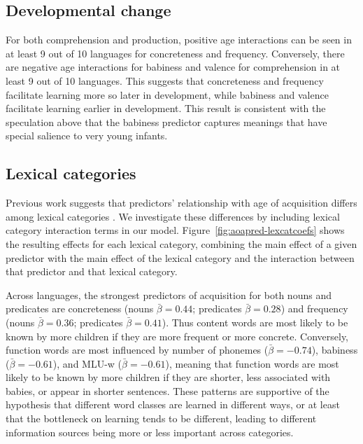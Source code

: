 \documentclass[
   11pt,
       ]{book}
\begin{document}
\hypertarget{developmental-change}{%
\subsection{Developmental change}\label{developmental-change}}

For both comprehension and production, positive age interactions can be seen in at least 9 out of 10 languages for concreteness and frequency. Conversely, there are negative age interactions for babiness and valence for comprehension in at least 9 out of 10 languages. This suggests that concreteness and frequency facilitate learning more so later in development, while babiness and valence facilitate learning earlier in development. This result is consistent with the speculation above that the babiness predictor captures meanings that have special salience to very young infants.

\hypertarget{lexical-categories}{%
\subsection{Lexical categories}\label{lexical-categories}}

Previous work suggests that predictors' relationship with age of acquisition differs among lexical categories \citep{goodman2008}. We investigate these differences by including lexical category interaction terms in our model. Figure~\ref{fig:aoapred-lexcatcoefs} shows the resulting effects for each lexical category, combining the main effect of a given predictor with the main effect of the lexical category and the interaction between that predictor and that lexical category.

Across languages, the strongest predictors of acquisition for both nouns and predicates are concreteness (nouns \(\bar{\beta} = 0.44\); predicates \(\bar{\beta} = 0.28\)) and frequency (nouns \(\bar{\beta} = 0.36\); predicates \(\bar{\beta} = 0.41\)). Thus content words are most likely to be known by more children if they are more frequent or more concrete. Conversely, function words are most influenced by number of phonemes (\(\bar{\beta} = -0.74\)), babiness (\(\bar{\beta} = -0.61\)), and MLU-w (\(\bar{\beta} = -0.61\)), meaning that function words are most likely to be known by more children if they are shorter, less associated with babies, or appear in shorter sentences. These patterns are supportive of the hypothesis that different word classes are learned in different ways, or at least that the bottleneck on learning tends to be different, leading to different information sources being more or less important across categories.
\end{document}
